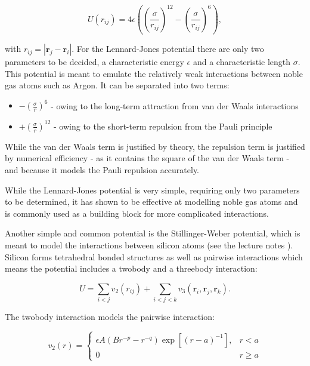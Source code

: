 $$ U(r_{ij}) = 4\epsilon \left(\left(\frac{\sigma}{r_{ij}}\right)^{12}
    - \left(\frac{\sigma}{r_{ij}}\right)^{6}\right) , $$

with $r_{ij} = \left| \bm{r}_j - \bm{r}_i \right|$.
For the Lennard-Jones potential there are only two parameters to be decided,
a characteristic energy $\epsilon$ and a characteristic length $\sigma$.
This potential is meant to emulate the relatively weak interactions
between noble gas atoms such as Argon.
It can be separated into two terms:

\begin{itemize}
    \item $\mathrel{-} \left(\frac{\sigma}{r}\right)^6$ - owing to the long-term
        attraction from van der Waals interactions
    \item $\mathrel{+} \left(\frac{\sigma}{r}\right)^{12}$ - owing to the short-term repulsion
        from the Pauli principle
\end{itemize}

While the van der Waals term is justified by theory, the repulsion term
is justified by numerical efficiency - as it contains the square of the van der Waals
term - and because it models the Pauli repulsion accurately.
\par
While the Lennard-Jones potential is very simple, requiring only two parameters
to be determined, it has shown to be effective at modelling noble gas atoms
and is commonly used as a building block for more complicated interactions.
\par
Another simple and common potential is the Stillinger-Weber potential,
which is meant to model the interactions between silicon atoms
(see the lecture notes \parencite[Abrams, Cameron]{che8002013}).
Silicon forms tetrahedral bonded structures as well as pairwise interactions
which means the potential includes a twobody and a threebody interaction:

\begin{equation}
    U = \sum_{i < j} v_2(r_{ij}) + \sum_{i < j < k} v_3(\bm{r}_i, \bm{r}_j, \bm{r}_k) .
\end{equation}

The twobody interaction models the pairwise interaction:

\begin{equation}
    v_2(r) =
    \begin{cases}
        \epsilon A (Br^{-p} - r^{-q}) \exp \left[ (r - a)^{-1} \right],
        & r < a \\
        0 & r \geq a
    \end{cases}
\end{equation}

